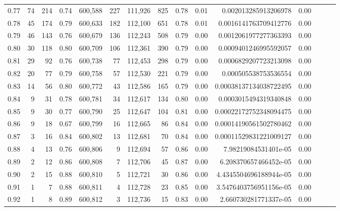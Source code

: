 \begin{tabular}{rrrrrrrrrrrrrrr}
0.77 &      74 &    214 &  0.74 &  600,588 &      227 &  111,926 &      825 &  0.78 &  0.01 &    0.002013285913206978 &      0.00 \\
0.78 &      45 &    174 &  0.79 &  600,633 &      182 &  112,100 &      651 &  0.78 &  0.01 &   0.0016141763709412776 &      0.00 \\
0.79 &      46 &    143 &  0.76 &  600,679 &      136 &  112,243 &      508 &  0.79 &  0.00 &   0.0012061977277363393 &      0.00 \\
0.80 &      30 &    118 &  0.80 &  600,709 &      106 &  112,361 &      390 &  0.79 &  0.00 &   0.0009401246995592057 &      0.00 \\
0.81 &      29 &     92 &  0.76 &  600,738 &       77 &  112,453 &      298 &  0.79 &  0.00 &   0.0006829207723213098 &      0.00 \\
0.82 &      20 &     77 &  0.79 &  600,758 &       57 &  112,530 &      221 &  0.79 &  0.00 &    0.000505538753536554 &      0.00 \\
0.83 &      14 &     56 &  0.80 &  600,772 &       43 &  112,586 &      165 &  0.79 &  0.00 &  0.00038137134038722495 &      0.00 \\
0.84 &       9 &     31 &  0.78 &  600,781 &       34 &  112,617 &      134 &  0.80 &  0.00 &   0.0003015494319340848 &      0.00 \\
0.85 &       9 &     30 &  0.77 &  600,790 &       25 &  112,647 &      104 &  0.81 &  0.00 &  0.00022172752348094475 &      0.00 \\
0.86 &       9 &     18 &  0.67 &  600,799 &       16 &  112,665 &       86 &  0.84 &  0.00 &  0.00014190561502780462 &      0.00 \\
0.87 &       3 &     16 &  0.84 &  600,802 &       13 &  112,681 &       70 &  0.84 &  0.00 &  0.00011529831221009127 &      0.00 \\
0.88 &       4 &     13 &  0.76 &  600,806 &        9 &  112,694 &       57 &  0.86 &  0.00 &    7.98219084531401e-05 &      0.00 \\
0.89 &       2 &     12 &  0.86 &  600,808 &        7 &  112,706 &       45 &  0.87 &  0.00 &   6.208370657466452e-05 &      0.00 \\
0.90 &       2 &     15 &  0.88 &  600,810 &        5 &  112,721 &       30 &  0.86 &  0.00 &  4.4345504696188944e-05 &      0.00 \\
0.91 &       1 &      7 &  0.88 &  600,811 &        4 &  112,728 &       23 &  0.85 &  0.00 &  3.5476403756951156e-05 &      0.00 \\
0.92 &       1 &      8 &  0.89 &  600,812 &        3 &  112,736 &       15 &  0.83 &  0.00 &   2.660730281771337e-05 &      0.00 \\

\end{tabular}
